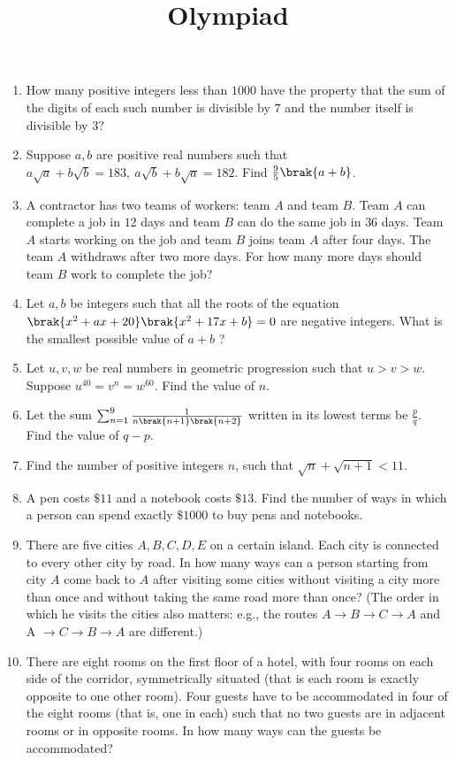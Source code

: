 \documentclass{article}
\date{}
\title{Olympiad}
\begin{document}
\maketitle
\begin{enumerate}

\item How many positive integers less than $1000$ have the property that the sum of the digits of each such number is divisible by $7$ and the number itself is divisible by $3$?
\item Suppose $a,b$ are positive real numbers such that $a\sqrt{a}+b\sqrt{b}=183,\ a\sqrt{b}+b\sqrt{a}=182$. Find $\frac{9}{5}\brak{a+b}$.
\item A contractor has two teams of workers: team $A$ and team $B$. Team $A$ can complete a job in $12$ days and team $B$ can do the same job in $36$ days. Team $A$ starts working on the job and team $B$ joins team $A$ after four days. The team $A$ withdraws after two more days. For how many more days should team $B$ work to complete the job?
\item Let $a,b$ be integers such that all the roots of the equation $\brak{x^{2}+ax+20}\brak{x^{2}+17x+b}=0$ are negative integers. What is the smallest possible value of $a+b$ ?
\item Let $u,v,w$ be real numbers in geometric progression such that $u>v>w$. Suppose $u^{40}=v^{n}=w^{60}$. Find the value of $n$.
\item Let the sum $\sum_{n=1}^{9}\frac{1}{n\brak{n+1}\brak{n+2}}$ written in its lowest terms be $\frac{p}{q}$. Find the value of $q-p$.
\item Find the number of positive integers $n$, such that $\sqrt{n}+\sqrt{n+1}<11$.
\item A pen costs $\$ 11$ and a notebook costs $\$ 13$. Find the number of ways in which a person can spend exactly $\$ 1000$ to buy pens and notebooks.
\item There are five cities $A, B, C, D, E$ on a certain island. Each city is connected to every other city by road. In how many ways can a person starting from city $A$ come back to $A$ after visiting some cities without visiting a city more than once and without taking the same road more than once? (The order in which he visits the cities also matters: e.g., the routes $A\rightarrow B\rightarrow C\rightarrow A$ and A $\rightarrow C \rightarrow B \rightarrow A$ are different.)
\item There are eight rooms on the first floor of a hotel, with four rooms on each side of the corridor, symmetrically situated (that is each room is exactly opposite to one other room). Four guests have to be accommodated in four of the eight rooms (that is, one in each) such that no two guests are in adjacent rooms or in opposite rooms. In how many ways can the guests be accommodated?

\end{enumerate}
\end{document}
